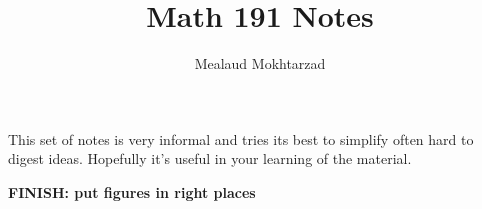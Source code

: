\documentclass{article}
\title{Math 191 Notes}
\author{Mealaud Mokhtarzad}
\date{}
\begin{document}
\maketitle

This set of notes is very informal and tries its best to simplify often hard to digest ideas. Hopefully it's useful in your learning of the material.

\textbf{FINISH: put figures in right places}

\newpage

\renewcommand{\headrulewidth}{0pt}
\tableofcontents
\newpage

\renewcommand{\headrulewidth}{0.4pt}


\newpage
\end{document}
